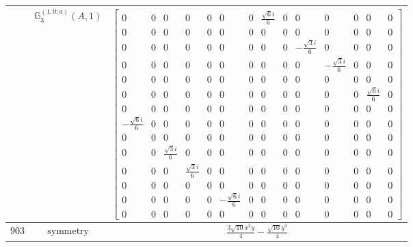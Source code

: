 \documentclass[fleqn,8pt,landscape]{jsarticle}
\begin{document}
\begin{longtable}{ccc}
$  $ & $ \mathbb{G}_{3}^{(1,0;a)}(A,1) $ & $ \begin{bmatrix} 0 & 0 & 0 & 0 & 0 & 0 & 0 & \frac{\sqrt{6} i}{6} & 0 & 0 & 0 & 0 & 0 & 0 \\ 0 & 0 & 0 & 0 & 0 & 0 & 0 & 0 & 0 & 0 & 0 & 0 & 0 & 0 \\ 0 & 0 & 0 & 0 & 0 & 0 & 0 & 0 & 0 & - \frac{\sqrt{3} i}{6} & 0 & 0 & 0 & 0 \\ 0 & 0 & 0 & 0 & 0 & 0 & 0 & 0 & 0 & 0 & - \frac{\sqrt{3} i}{6} & 0 & 0 & 0 \\ 0 & 0 & 0 & 0 & 0 & 0 & 0 & 0 & 0 & 0 & 0 & 0 & 0 & 0 \\ 0 & 0 & 0 & 0 & 0 & 0 & 0 & 0 & 0 & 0 & 0 & 0 & \frac{\sqrt{6} i}{6} & 0 \\ 0 & 0 & 0 & 0 & 0 & 0 & 0 & 0 & 0 & 0 & 0 & 0 & 0 & 0 \\ - \frac{\sqrt{6} i}{6} & 0 & 0 & 0 & 0 & 0 & 0 & 0 & 0 & 0 & 0 & 0 & 0 & 0 \\ 0 & 0 & 0 & 0 & 0 & 0 & 0 & 0 & 0 & 0 & 0 & 0 & 0 & 0 \\ 0 & 0 & \frac{\sqrt{3} i}{6} & 0 & 0 & 0 & 0 & 0 & 0 & 0 & 0 & 0 & 0 & 0 \\ 0 & 0 & 0 & \frac{\sqrt{3} i}{6} & 0 & 0 & 0 & 0 & 0 & 0 & 0 & 0 & 0 & 0 \\ 0 & 0 & 0 & 0 & 0 & 0 & 0 & 0 & 0 & 0 & 0 & 0 & 0 & 0 \\ 0 & 0 & 0 & 0 & 0 & - \frac{\sqrt{6} i}{6} & 0 & 0 & 0 & 0 & 0 & 0 & 0 & 0 \\ 0 & 0 & 0 & 0 & 0 & 0 & 0 & 0 & 0 & 0 & 0 & 0 & 0 & 0 \end{bmatrix} $ \\ \hline
$ 903 $ & $ \text{symmetry} $ & $ \frac{3 \sqrt{10} x^{2} y}{4} - \frac{\sqrt{10} y^{3}}{4} $ \\

\end{longtable}
\end{document}
